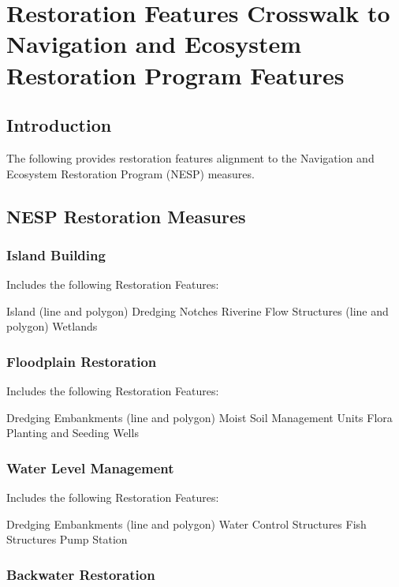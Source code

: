\documentclass[
  letterpaper,
  DIV=11,
  numbers=noendperiod]{scrreprt}
\begin{document}
\chapter{Restoration Features Crosswalk to Navigation and Ecosystem
Restoration Program
Features}\label{restoration-features-crosswalk-to-navigation-and-ecosystem-restoration-program-features}

\section{Introduction}\label{introduction-1}

The following provides restoration features alignment to the Navigation
and Ecosystem Restoration Program (NESP) measures.

\section{NESP Restoration Measures}\label{nesp-restoration-measures}

\subsection{Island Building}\label{island-building}

Includes the following Restoration Features:

Island (line and polygon) Dredging Notches Riverine Flow Structures
(line and polygon) Wetlands

\subsection{Floodplain Restoration}\label{floodplain-restoration}

Includes the following Restoration Features:

Dredging Embankments (line and polygon) Moist Soil Management Units
Flora Planting and Seeding Wells

\subsection{Water Level Management}\label{water-level-management}

Includes the following Restoration Features:

Dredging Embankments (line and polygon) Water Control Structures Fish
Structures Pump Station

\subsection{Backwater Restoration}\label{backwater-restoration}
\end{document}
